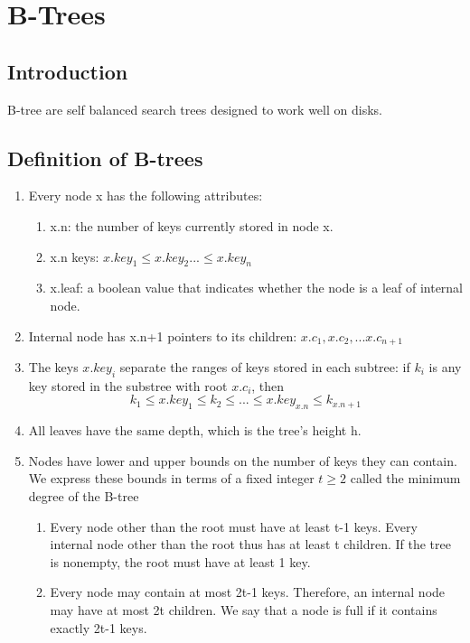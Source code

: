 \section{B-Trees}

\subsection{Introduction}\hspace*{5mm}

    B-tree are self balanced search trees designed to work well on disks.

\subsection{Definition of B-trees}

    \begin{enumerate}
        \item Every node x has the following attributes:
        \begin{enumerate}
            \item x.n: the number of keys currently stored in node x.
            \item x.n keys: $x.key_1\leq x.key_2... \leq x.key_n$
            \item x.leaf: a boolean value that indicates whether the node is a leaf
            of internal node.
        \end{enumerate}
        \item Internal node has  x.n+1 pointers to its children:
        $x.c_1,x.c_2,...x.c_{n+1}$
        \item The keys $x.key_i$ separate the ranges of keys stored in each subtree:
        if $k_i$ is any key stored in the substree with root $x.c_i$, then
        \begin{equation}
            k_1 \leq x.key_1 \leq k_2 \leq ... \leq x.key_{x.n} \leq k_{x.n+1}
        \end{equation}
        \item All leaves have the same depth, which is the tree's height h.
        \item Nodes have lower and upper bounds on the number of keys they can contain.
        We express these bounds in terms of a fixed integer $t\geq 2$ called the minimum
        degree of the B-tree
        \begin{enumerate}
            \item Every node other than the root must have at least t-1 keys. Every 
            internal node other than the root thus has at least t children. If the 
            tree is nonempty, the root must have at least 1 key.
            \item Every node may contain at most 2t-1 keys. Therefore, an internal
            node may have at most 2t children. We say that a node is full if it 
            contains exactly 2t-1 keys.
        \end{enumerate}
    \end{enumerate}

